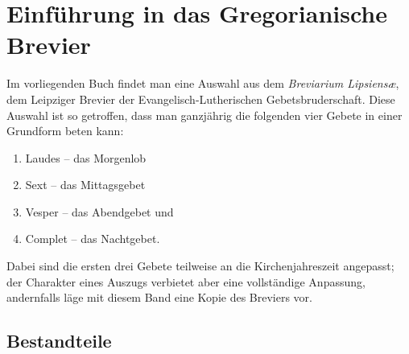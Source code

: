 \documentclass[medstaff,decorativeinitials,fontsize=14pt,paper=a4]{gregorian}
\begin{document}
\chapter*{Einführung in das Gregorianische Brevier}
Im vorliegenden Buch findet man eine Auswahl aus dem \textit{Breviarium Lipsiens\ae{}}, dem Leipziger Brevier der Evangelisch-Lutherischen Gebetsbruderschaft. Diese Auswahl ist so getroffen, dass man ganzjährig die folgenden vier Gebete in einer Grundform beten kann:\par
\begin{enumerate}
 \item Laudes -- das Morgenlob
\item Sext -- das Mittagsgebet
\item Vesper -- das Abendgebet und
\item Complet -- das Nachtgebet.
\end{enumerate}
Dabei sind die ersten drei Gebete teilweise an die Kirchenjahreszeit angepasst; der Charakter eines Auszugs verbietet aber eine vollständige Anpassung, andernfalls läge mit diesem Band eine Kopie des Breviers vor.
\section*{Bestandteile}
\end{document}
